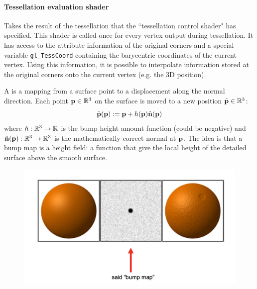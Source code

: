 \documentclass[11pt]{article}
\numberwithin{equation}{section}
\begin{document}
\paragraph{Tessellation evaluation shader}
Takes the result of the tessellation that the ``tessellation control shader" has specified. This shader is called once for every vertex output during tessellation. It has access to the attribute information of the original corners and a special variable \texttt{gl\_TessCoord} containing the barycentric coordinates of the current vertex. Using this information, it is possible to interpolate information stored at the original corners onto the current vertex (e.g. the 3D position).

A  is a mapping from a surface point to a displacement along the normal direction. Each point $\textbf{p} \in \mathbb{R}^3$ on the surface is moved to a new position $\tilde{\textbf{p}} \in \mathbb{R}^3$:
\begin{equation}
	\tilde{\textbf{p}}(\textbf{p}) := \textbf{p} + h(\textbf{p})\hat{\textbf{n}}(\textbf{p})
\end{equation} 
where $h: \mathbb{R}^3 \rightarrow \mathbb{R}$ is the bump height amount function (could be negative) and $\hat{\textbf{n}}(\textbf{p}): \mathbb{R}^3 \rightarrow \mathbb{R}^3$ is the mathematically correct normal at $\textbf{p}$.
\remark
The idea is that a bump map is a height field: a function that give the local height of the detailed surface above the smooth surface.

\begin{figure}[H]
	\centering
	\includegraphics[scale=0.5]{p40}
\end{figure}
\end{document}
